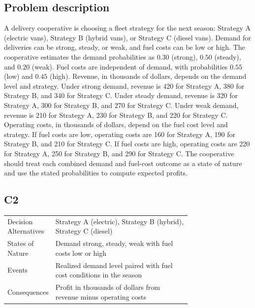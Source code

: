 \begin{ExamProblems}
		\subsection*{Problem description}
		A delivery cooperative is choosing a fleet strategy for the next season: Strategy A (electric vans),
		Strategy B (hybrid vans), or Strategy C (diesel vans). Demand for deliveries can be strong, steady, or weak, and fuel costs can be low or high. The cooperative estimates the demand probabilities as $0.30$ (strong), $0.50$ (steady), and $0.20$ (weak). Fuel costs are independent of demand, with probabilities $0.55$ (low) and $0.45$ (high). Revenue, in thousands of dollars, depends on the demand level and strategy. Under strong demand, revenue is 420 for Strategy A, 380 for Strategy B, and 340 for Strategy C. Under steady demand, revenue is 320 for Strategy A, 300 for Strategy B, and 270 for Strategy C. Under weak demand, revenue is 210 for Strategy A, 230 for Strategy B, and 220 for Strategy C. Operating costs, in thousands of dollars, depend on the fuel cost level and strategy. If fuel costs are low, operating costs are 160 for Strategy A, 190 for Strategy B, and 210 for Strategy C. If fuel costs are high, operating costs are 220 for Strategy A, 250 for Strategy B, and 290 for Strategy C. The cooperative should treat each combined demand and fuel-cost outcome as a state of nature and use the stated probabilities to compute expected profits.

		\subsection*{C2}
		\begin{center}
			\begin{tabular}{l p{0.74\linewidth}}
				\toprule
				Decision Alternatives & Strategy A (electric), Strategy B (hybrid), Strategy C (diesel) \\
				States of Nature & Demand strong, steady, weak with fuel costs low or high \\
				Events & Realized demand level paired with fuel cost conditions in the season \\
				Consequences & Profit in thousands of dollars from revenue minus operating costs \\
				\bottomrule
			\end{tabular}
		\end{center}


\end{ExamProblems}
